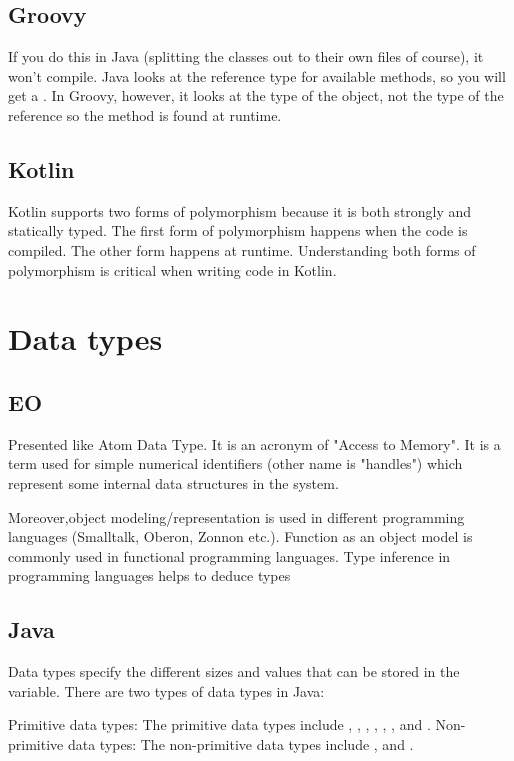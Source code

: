 \documentclass[12pt]{book}
\begin{document}
{{\subsection{Groovy}
If you do this in Java (splitting the classes out to their own files of course), it won't compile. Java looks at the reference type for available methods, so you will get a . In Groovy, however, it looks at the type of the object, not the type of the reference so the method is found at runtime.

\subsection{Kotlin}
Kotlin supports two forms of polymorphism because it is both strongly and statically typed. The first form of polymorphism happens when the code is compiled. The other form happens at runtime. Understanding both forms of polymorphism is critical when writing code in Kotlin.

\section{Data types}

\subsection{EO}
Presented like Atom Data Type. It is an acronym of "Access to Memory". It is a term used for simple numerical identifiers (other name is "handles") which represent some internal data structures in the system.

Moreover,object modeling/representation is used in different programming languages (Smalltalk, Oberon, Zonnon etc.). Function as an object model is commonly used in functional programming languages. Type inference in programming languages helps to deduce types

\subsection{Java}
Data types specify the different sizes and values that can be stored in the variable.  There are two types of data types in Java:

Primitive data types: The primitive data types include , , , , , ,  and . Non-primitive data types: The non-primitive data types include ,  and .

}}
\end{document}
